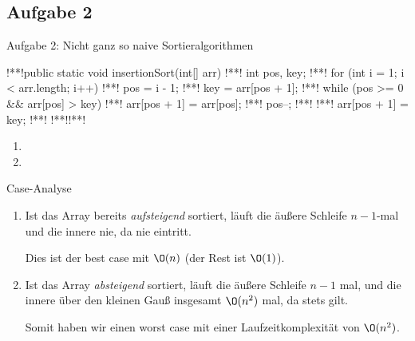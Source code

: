 \subsection{Aufgabe 2}
{\taskenum
\begin{frame}[fragile,c]{Aufgabe 2: Nicht ganz so naive Sortieralgorithmen}
\bigskip
{}
\columns[onlytextwidth,c]
\begin{plainjava}
!**!public static void insertionSort(int[] arr) {
!**!    int pos, key;
!**!    for (int i = 1; i < arr.length; i++) {
!**!        pos = i - 1;
!**!        key = arr[pos + 1];
!**!        while (pos >= 0 && arr[pos] > key) {
!**!            arr[pos + 1] = arr[pos];
!**!            pos--;
!**!        }
!**!        arr[pos + 1] = key;
!**!    }
!**!}!**!
\end{plainjava}
\begin{enumerate}
    \itemsep6pt
    \item<4-> 
    \item<5-> 
\end{enumerate}
\endcolumns
\end{frame}

\begin{frame}{Case-Analyse}
\begin{enumerate}
    \itemsep12pt
    \item {}\pause
    Ist das Array bereits \textit{aufsteigend} sortiert, läuft die äußere Schleife \(n - 1\)-mal und die innere nie, da nie  eintritt.\medskip\pause

    Dies ist der best case mit \(\O(n)\) (der Rest ist \(\O(1)\)).
    \item {}\pause
    Ist das Array \textit{absteigend} sortiert, läuft die äußere Schleife \(n - 1\) mal, und die innere über den kleinen Gauß insgesamt \(\O(n^2)\) mal, da stets  gilt.\medskip

    Somit haben wir einen worst case mit einer Laufzeitkomplexität von \(\O(n^2)\).
\end{enumerate}
\end{frame}
}
